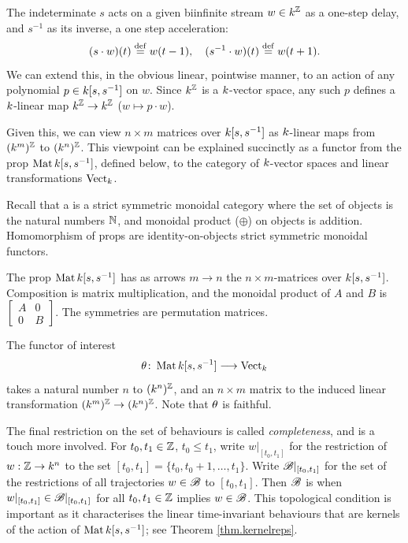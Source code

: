 The indeterminate $s$ acts on a given biinfinite stream $w \in k^{\mathbb Z}$ as a
one-step delay, and $s^{-1}$ as its inverse, a one step acceleration: 
\[ 
  (s\cdot w) (t) \stackrel{\mathrm{def}}{=} w(t-1),\quad (s^{-1}\cdot w)(t) \stackrel{\mathrm{def}}{=} w(t+1).
\]
We can extend this, in the obvious linear, pointwise manner, to an action of any
polynomial $p\in {k[s,s^{-1}]}$ on $w$.  Since $k^{\mathbb Z}$ is a $k$-vector space, any such
$p$ defines a $k$-linear map $k^{\mathbb Z}\to k^{\mathbb Z}$ ($w \mapsto p\cdot w$).

Given this, we can view $n\times m$ matrices over ${k[s,s^{-1}]}$ as $k$-linear maps from
$(k^m)^{\mathbb Z}$ to $(k^n)^{\mathbb Z}$. This viewpoint can be explained succinctly as a
functor from the prop $\operatorname{\mathrm{Mat}}{k[s,s^{-1}]}$, defined below, to the category of $k$-vector
spaces and linear transformations $\operatorname{\mathrm{Vect}}_k$.

Recall that a  is a strict symmetric monoidal category where the
set of objects is the natural numbers ${\mathbb N}$, and monoidal product ($\oplus$) on
objects is addition. Homomorphism of props are identity-on-objects strict
symmetric monoidal functors.

\begin{definition}
  The prop $\operatorname{\mathrm{Mat}}{k[s,s^{-1}]}$ has as arrows $m \to n$ the $n\times m$-matrices over
  ${k[s,s^{-1}]}$. Composition is matrix multiplication, and the monoidal product of $A$
  and $B$ is $\left[\begin{smallmatrix} A & 0 \\ 0 & B
  \end{smallmatrix}\right]$. The symmetries are permutation matrices.
\end{definition}

The functor of interest
\[
  \theta{\colon} \operatorname{\mathrm{Mat}}{k[s,s^{-1}]} \longrightarrow \operatorname{\mathrm{Vect}}_k
\]
takes a natural number $n$ to $(k^n)^{\mathbb Z}$, and an $n\times m$ matrix to the
induced linear transformation $(k^m)^{\mathbb Z} \to (k^n)^{\mathbb Z}$. Note that $\theta$ is
faithful.

\smallskip
The final restriction on the set of behaviours is called \emph{completeness},
and is a touch more involved. For $t_0,t_1 \in {\mathbb Z}$, $t_0 \le t_1$, write
$w|_{[t_0,t_1]}$ for the restriction of $w: {\mathbb Z} \to k^n$ to the set $[t_0,t_1] =
\{t_0, t_0+1, \dots, t_1\}$. Write  ${\mathscr B}|_{[t_0,t_1]}$ for the set of the
restrictions of all trajectories $w \in {\mathscr B}$ to $[t_0,t_1]$.  Then ${\mathscr B}$ is
 when $w|_{[t_0,t_1]} \in {\mathscr B}|_{[t_0,t_1]}$ for all $t_0,t_1
\in {\mathbb Z}$ implies $w \in {\mathscr B}$. This topological condition is important as it
characterises the linear time-invariant behaviours that are kernels of the
action of $\operatorname{\mathrm{Mat}}{k[s,s^{-1}]}$; see Theorem \ref{thm.kernelreps}.

